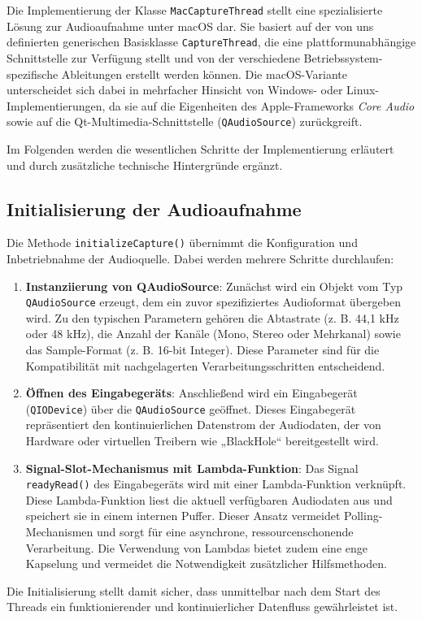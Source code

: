 Die Implementierung der Klasse \texttt{MacCaptureThread} stellt eine spezialisierte Lösung zur Audioaufnahme unter macOS dar. Sie basiert auf der von uns definierten generischen Basisklasse \texttt{CaptureThread}, die eine plattformunabhängige Schnittstelle zur Verfügung stellt und von der verschiedene Betriebssystem-spezifische Ableitungen erstellt werden können. 
Die macOS-Variante unterscheidet sich dabei in mehrfacher Hinsicht von Windows- oder Linux-Implementierungen, da sie auf die Eigenheiten des Apple-Frameworks \textit{Core Audio} sowie auf die Qt-Multimedia-Schnittstelle (\texttt{QAudioSource}) zurückgreift.

Im Folgenden werden die wesentlichen Schritte der Implementierung erläutert und durch zusätzliche technische Hintergründe ergänzt.

\subsection{Initialisierung der Audioaufnahme}
Die Methode \texttt{initializeCapture()} übernimmt die Konfiguration und Inbetriebnahme der Audioquelle. Dabei werden mehrere Schritte durchlaufen:
\begin{enumerate}
    \item \textbf{Instanziierung von QAudioSource}:  
    Zunächst wird ein Objekt vom Typ \texttt{QAudioSource} erzeugt, dem ein zuvor spezifiziertes Audioformat übergeben wird. Zu den typischen Parametern gehören die Abtastrate (z. B. 44{,}1 kHz oder 48 kHz), die Anzahl der Kanäle (Mono, Stereo oder Mehrkanal) sowie das Sample-Format (z. B. 16-bit Integer). Diese Parameter sind für die Kompatibilität mit nachgelagerten Verarbeitungsschritten entscheidend.
    
    \item \textbf{Öffnen des Eingabegeräts}:  
    Anschließend wird ein Eingabegerät (\texttt{QIODevice}) über die \texttt{QAudioSource} geöffnet. Dieses Eingabegerät repräsentiert den kontinuierlichen Datenstrom der Audiodaten, der von Hardware oder virtuellen Treibern wie „BlackHole“ bereitgestellt wird.
    
    \item \textbf{Signal-Slot-Mechanismus mit Lambda-Funktion}:  
    Das Signal \texttt{readyRead()} des Eingabegeräts wird mit einer Lambda-Funktion verknüpft. Diese Lambda-Funktion liest die aktuell verfügbaren Audiodaten aus und speichert sie in einem internen Puffer. Dieser Ansatz vermeidet Polling-Mechanismen und sorgt für eine asynchrone, ressourcenschonende Verarbeitung. Die Verwendung von Lambdas bietet zudem eine enge Kapselung und vermeidet die Notwendigkeit zusätzlicher Hilfsmethoden.
\end{enumerate}
Die Initialisierung stellt damit sicher, dass unmittelbar nach dem Start des Threads ein funktionierender und kontinuierlicher Datenfluss gewährleistet ist.

